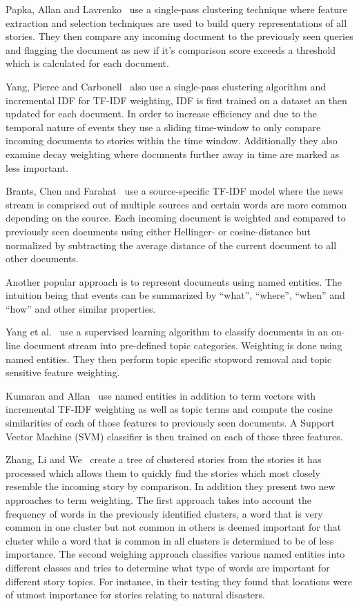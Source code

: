Papka, Allan and Lavrenko~\cite{papka1998online} use a single-pass clustering technique where feature extraction and selection techniques are used to build query representations of all stories. They then compare any incoming document to the previously seen queries and flagging the document as new if it's comparison score exceeds a threshold which is calculated for each document.

Yang, Pierce and Carbonell~\cite{yang1998study} also use a single-pass clustering algorithm and incremental IDF for TF-IDF weighting, IDF is first trained on a dataset an then updated for each document. In order to increase efficiency and due to the temporal nature of events they use a sliding time-window to only compare incoming documents to stories within the time window. Additionally they also examine decay weighting where documents further away in time are marked as less important.

Brants, Chen and Farahat~\cite{brants2003system} use a source-specific TF-IDF model where the news stream is comprised out of multiple sources and certain words are more common depending on the source. Each incoming document is weighted and compared to previously seen documents using either Hellinger- or cosine-distance but normalized by subtracting the average distance of the current document to all other documents. %

Another popular approach is to represent documents using named entities. The intuition being that events can be summarized  by ``what'', ``where'', ``when'' and ``how'' and other similar properties. %

Yang et al.~\cite{yang2002topic} use a supervised learning algorithm to classify documents in an on-line document stream into pre-defined topic categories. Weighting is done using named entities. They then perform topic specific stopword removal and topic sensitive feature weighting.

Kumaran and Allan~\cite{kumaran2005using} use named entities in addition to term vectors with incremental TF-IDF weighting as well as topic terms and compute the cosine similarities of each of those features to previously seen documents. A Support Vector Machine (SVM) classifier is then trained on each of those three features.

Zhang, Li and We~\cite{zhang2007new} create a tree of clustered stories from the stories it has processed which allows them to quickly find the stories which most closely resemble the incoming story by comparison. In addition they present two new approaches to term weighting. The first approach takes into account the frequency of words in the previously identified clusters, a word that is very common in one cluster but not common in others is deemed important for that cluster while a word that is common in all clusters is determined to be of less importance. The second weighing approach classifies various named entities into different classes and tries to determine what type of words are important for different story topics. For instance, in their testing they found that locations were of utmost importance for stories relating to natural disasters.

